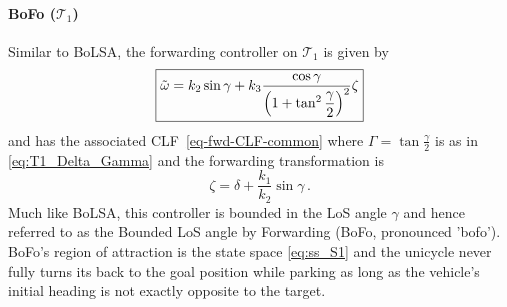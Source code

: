 \documentclass[journal,twoside,web]{ieeecolor}
\theoremstyle{definition}
\begin{document}
\paragraph{BoFo ($\mathcal{T}_1$)} Similar to BoLSA, the forwarding controller on $\mathcal{T}_1$ is given by 
\begin{equation}
\label{eq:BoFo}
\fbox{$\tilde\omega = k_2\sin\gamma + k_3\dfrac{\cos\gamma}{\left(1 + \tan^2 \dfrac{\gamma}{2}\right)^2}\zeta
$}
\end{equation}
and has the associated CLF~\eqref{eq-fwd-CLF-common}
where $\Gamma = \tan\frac{\gamma}{2}$ is as in \eqref{eq:T1_Delta_Gamma} and the forwarding transformation is
\begin{equation}
    \zeta = \delta + \dfrac{k_1}{k_2}\sin\gamma \,.
\end{equation}
Much like BoLSA, this controller is bounded in the LoS angle $\gamma$ and hence referred to as the Bounded LoS angle by Forwarding (BoFo, pronounced 'bofo'). BoFo's region of attraction is the state space \eqref{eq:ss_S1} and the unicycle never fully turns its back to the goal position while parking as long as the vehicle's initial heading is not exactly opposite to the target. 

\end{document}
